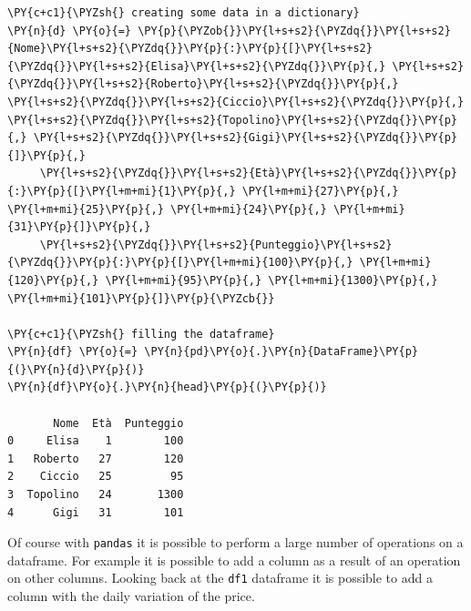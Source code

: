 \begin{tcolorbox}[breakable, size=fbox, boxrule=1pt, pad at break*=1mm,colback=cellbackground, colframe=cellborder]
\begin{Verbatim}[commandchars=\\\{\}]
\PY{c+c1}{\PYZsh{} creating some data in a dictionary}
\PY{n}{d} \PY{o}{=} \PY{p}{\PYZob{}}\PY{l+s+s2}{\PYZdq{}}\PY{l+s+s2}{Nome}\PY{l+s+s2}{\PYZdq{}}\PY{p}{:}\PY{p}{[}\PY{l+s+s2}{\PYZdq{}}\PY{l+s+s2}{Elisa}\PY{l+s+s2}{\PYZdq{}}\PY{p}{,} \PY{l+s+s2}{\PYZdq{}}\PY{l+s+s2}{Roberto}\PY{l+s+s2}{\PYZdq{}}\PY{p}{,} \PY{l+s+s2}{\PYZdq{}}\PY{l+s+s2}{Ciccio}\PY{l+s+s2}{\PYZdq{}}\PY{p}{,} \PY{l+s+s2}{\PYZdq{}}\PY{l+s+s2}{Topolino}\PY{l+s+s2}{\PYZdq{}}\PY{p}{,} \PY{l+s+s2}{\PYZdq{}}\PY{l+s+s2}{Gigi}\PY{l+s+s2}{\PYZdq{}}\PY{p}{]}\PY{p}{,}
     \PY{l+s+s2}{\PYZdq{}}\PY{l+s+s2}{Età}\PY{l+s+s2}{\PYZdq{}}\PY{p}{:}\PY{p}{[}\PY{l+m+mi}{1}\PY{p}{,} \PY{l+m+mi}{27}\PY{p}{,} \PY{l+m+mi}{25}\PY{p}{,} \PY{l+m+mi}{24}\PY{p}{,} \PY{l+m+mi}{31}\PY{p}{]}\PY{p}{,}
     \PY{l+s+s2}{\PYZdq{}}\PY{l+s+s2}{Punteggio}\PY{l+s+s2}{\PYZdq{}}\PY{p}{:}\PY{p}{[}\PY{l+m+mi}{100}\PY{p}{,} \PY{l+m+mi}{120}\PY{p}{,} \PY{l+m+mi}{95}\PY{p}{,} \PY{l+m+mi}{1300}\PY{p}{,} \PY{l+m+mi}{101}\PY{p}{]}\PY{p}{\PYZcb{}}

\PY{c+c1}{\PYZsh{} filling the dataframe}
\PY{n}{df} \PY{o}{=} \PY{n}{pd}\PY{o}{.}\PY{n}{DataFrame}\PY{p}{(}\PY{n}{d}\PY{p}{)}
\PY{n}{df}\PY{o}{.}\PY{n}{head}\PY{p}{(}\PY{p}{)}

       Nome  Età  Punteggio
0     Elisa    1        100
1   Roberto   27        120
2    Ciccio   25         95
3  Topolino   24       1300
4      Gigi   31        101
\end{Verbatim}
\end{tcolorbox}

Of course with \texttt{pandas} it is possible to perform a large number of operations on a dataframe. For example it is possible to add a column as a result of an operation on other columns. Looking back at the \texttt{df1} dataframe it is possible to add a column with the daily variation of the price.

